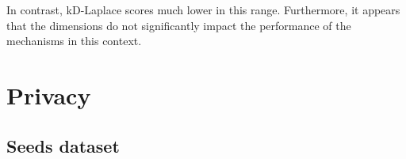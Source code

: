 In contrast, kD-Laplace scores much lower in this range. Furthermore, it appears that the dimensions do not significantly impact the performance of the mechanisms in this context.
\newpage
\section{Privacy}
\subsection{Seeds dataset}
